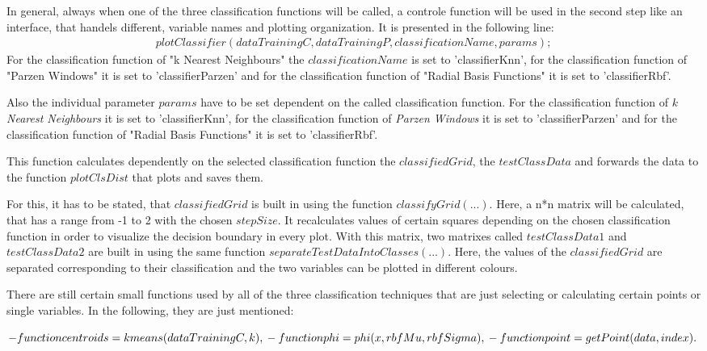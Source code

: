 \documentclass[a4paper,headings=small]{scrartcl}
\begin{document}
In general, always when one of the three classification functions will be called,
a controle function will be used in the second step like an interface, that handels different,
variable names and plotting organization. It is presented in the following line:
\begin{align}
plotClassifier(dataTrainingC, dataTrainingP, classificationName, params);
\end{align}
For the classification function of "k Nearest Neighbours" the $classificationName$ is set to 'classifierKnn',
for the classification function of "Parzen Windows" it is set to 'classifierParzen'
and for the classification function of "Radial Basis Functions" it is set to 'classifierRbf'.

Also the individual parameter $params$ have to be set dependent on the called classification function.
For the classification function of \emph{$k$ Nearest Neighbours} it is set to 'classifierKnn',
for the classification function of \emph{Parzen Windows} it is set to 'classifierParzen'
and for the classification function of "Radial Basis Functions" it is set to 'classifierRbf'.

This function calculates dependently on the selected classification function the $classified Grid$,
the $testClassData$ and forwards the data to the function $plotClsDist$ that plots and saves them.

For this, it has to be stated, that $classifiedGrid$ is built in using the function $classifyGrid(...)$.
Here, a n*n matrix will be calculated, that has a range from -1 to 2 with the chosen $stepSize$.
It recalculates values of certain squares depending on the chosen classification function
in order to visualize the decision boundary in every plot.
With this matrix, two matrixes called $testClassData1$ and $testClassData2$ are built in using
the same function $separateTestDataIntoClasses(...)$.
Here, the values of the $classifiedGrid$ are separated corresponding to their classification
and the two variables can be plotted in different colours.

There are still certain small functions used by all of the three classification techniques
that are just selecting or calculating certain points or single variables.
In the following, they are just mentioned:

$-  function centroids = kmeans(dataTrainingC, k),\\
 -  function phi = phi(x, rbfMu, rbfSigma),\\
 -  function point = getPoint(data, index).\\
$
\end{document}
